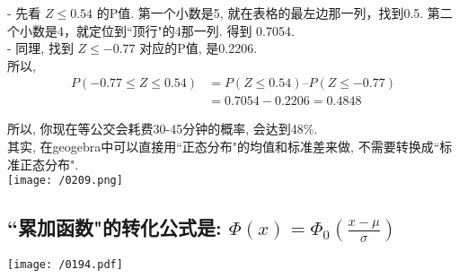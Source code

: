 \documentclass[UTF8]{ctexart}
\begin{document}
\begin{myEnvSample}
	- 先看 $Z \leq 0.54$ 的P值.  第一个小数是5, 就在表格的最左边那一列，找到0.5. 第二个小数是4，就定位到``顶行"的4那一列. 得到 0.7054. \\
	- 同理, 找到 $Z \leq -0.77$ 对应的P值, 是0.2206. \\
	
	所以,
	\begin{align*}  %
P\left( -0.77\leq Z\leq 0.54 \right) &=P\left( Z\leq 0.54 \right) –P\left( Z\leq -0.77 \right) \\
&=0.7054-0.2206=0.4848
	\end{align*}

所以, 你现在等公交会耗费30-45分钟的概率, 会达到48\%. \\
	
	其实, 在geogebra中可以直接用``正态分布"的均值和标准差来做, 不需要转换成``标准正态分布". \\
	\texttt{[image: /0209.png]} 	
	
\end{myEnvSample}




\subsection{``累加函数"的转化公式是: $\boxed{\varPhi (x)=\varPhi _0(\frac{x-\mu}{\sigma})	}$}

\texttt{[image: /0194.pdf]} \\
\end{document}
